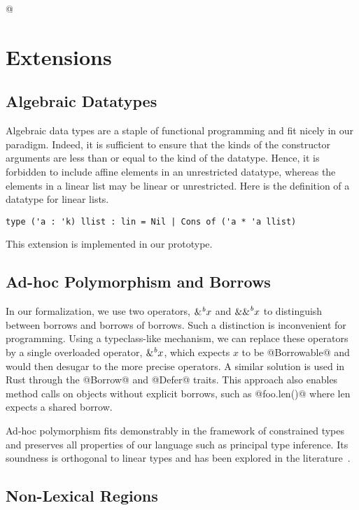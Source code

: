 \lstMakeShortInline[keepspaces,basicstyle=\small\ttfamily]@
\section{Extensions}

\subsection{Algebraic Datatypes}

Algebraic data types are a staple of functional programming and fit nicely
in our paradigm. Indeed, it is sufficient to ensure  that the kinds of
the constructor arguments are less than or equal to the kind of the datatype.
Hence, it is forbidden to include affine elements in an unrestricted
datatype, whereas the elements in a linear list may be linear or
unrestricted. 
Here is the definition of a datatype for linear lists.

\begin{lstlisting}
type ('a : 'k) llist : lin = Nil | Cons of ('a * 'a llist)
\end{lstlisting}

This extension is implemented in our prototype.

\subsection{Ad-hoc Polymorphism and Borrows}

In our formalization, we use two operators, ${\&}^{\textit{b}}x$ and ${\&\&}^{\textit{b}}x$ to
distinguish between borrows and borrows of borrows.
Such a distinction is inconvenient for programming.
Using a typeclass-like mechanism, we can replace these operators
by a single overloaded operator, ${\&}^{\textit{b}}x$, which expects $x$ to be @Borrowable@ and
would then desugar to the more precise operators.
A similar solution is used in Rust through the @Borrow@ and @Defer@
traits.
This approach also enables method calls on objects without
explicit borrows, such as @foo.len()@ where len expects a shared borrow.

Ad-hoc polymorphism fits demonstrably in the \hmx framework of constrained
types and preserves all properties of our language such
as principal type inference. Its soundness is orthogonal to linear types
and has been explored in the literature~\citep{DBLP:conf/fpca/OderskyWW95}.

\subsection{Non-Lexical Regions}

